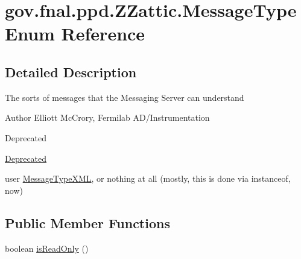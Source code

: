 \hypertarget{enumgov_1_1fnal_1_1ppd_1_1ZZattic_1_1MessageType}{\section{gov.\-fnal.\-ppd.\-Z\-Zattic.\-Message\-Type Enum Reference}
\label{enumgov_1_1fnal_1_1ppd_1_1ZZattic_1_1MessageType}
}


\subsection{Detailed Description}
The sorts of messages that the Messaging Server can understand

\begin{DoxyAuthor}{Author}
Elliott Mc\-Crory, Fermilab A\-D/\-Instrumentation 
\end{DoxyAuthor}
\begin{DoxyRefDesc}{Deprecated}
\item[\hyperlink{deprecated__deprecated000016}{Deprecated}]
\begin{DoxyItemize}
\item user \hyperlink{enumgov_1_1fnal_1_1ppd_1_1ZZattic_1_1MessageTypeXML}{Message\-Type\-X\-M\-L}, or nothing at all (mostly, this is done via instanceof, now)
\end{DoxyItemize}\end{DoxyRefDesc}
\subsection*{Public Member Functions}
\begin{DoxyCompactItemize}
\item 
boolean \hyperlink{enumgov_1_1fnal_1_1ppd_1_1ZZattic_1_1MessageType_af12ae0f8b82f8ffe3fdec70d55f4b00b}{is\-Read\-Only} ()
\end{DoxyCompactItemize}
